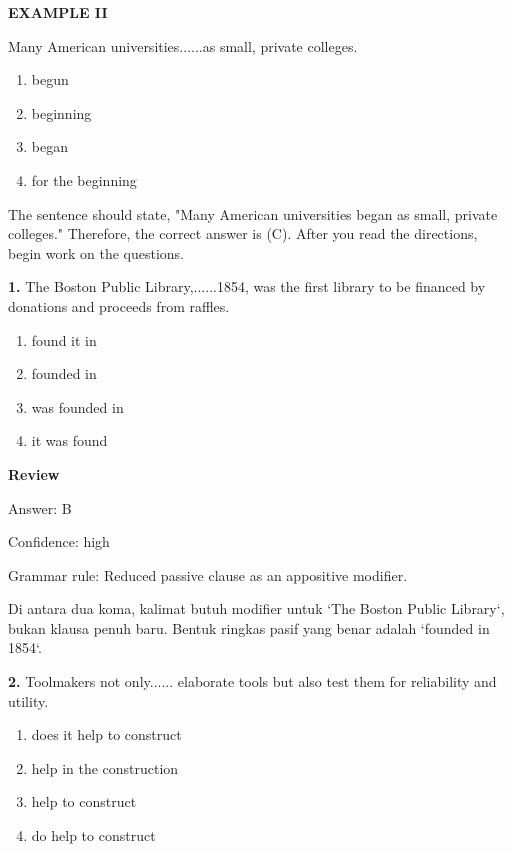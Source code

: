 \documentclass[12pt]{article}
\begin{document}
\begin{exampleblock}
\textbf{EXAMPLE II}\par
\noindent Many American universities......as small, private colleges.
\begin{enumerate}[label=(\Alph*),leftmargin=*,itemsep=0.2em]
\item begun
\item beginning
\item began
\item for the beginning
\end{enumerate}
\vspace{0.25\baselineskip}
The sentence should state, "Many American universities began as small, private colleges." Therefore, the correct answer is (C). After you read the directions, begin work on the questions.\par
\end{exampleblock}
\noindent\textbf{1.} The Boston Public Library,......1854, was the first library to be financed by donations and proceeds from raffles.
\begin{enumerate}[label=(\Alph*),leftmargin=*,itemsep=0.2em]
\item found it in
\item founded in
\item was founded in
\item it was found
\end{enumerate}
\par
\begingroup
\setlength{\parskip}{0pt}
\setlength{\parindent}{0pt}
\textbf{Review}\par
Answer: B\par
Confidence: high\par
Grammar rule: Reduced passive clause as an appositive modifier.\par
Di antara dua koma, kalimat butuh modifier untuk `The Boston Public Library`, bukan klausa penuh baru. Bentuk ringkas pasif yang benar adalah `founded in 1854`.\par
\endgroup
\par
\vspace{0.25\baselineskip}
\noindent\textbf{2.} Toolmakers not only...... elaborate tools but also test them for reliability and utility.
\begin{enumerate}[label=(\Alph*),leftmargin=*,itemsep=0.2em]
\item does it help to construct
\item help in the construction
\item help to construct
\item do help to construct
\end{enumerate}
\end{document}

